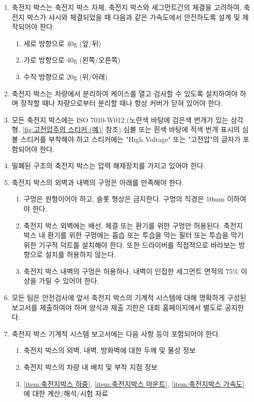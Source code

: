 \documentclass[final,a4paper,10pt]{report}
\begin{document}
\begin{enumerate}
  \item 축전지 박스는 축전지 박스 자체, 축전지 박스와 세그먼트간의 체결을 고려하여, 축전지 박스가 샤시와 체결되었을 때 다음과 같은 가속도에서 안전하도록 설계 및 제작되어야 한다. \label{item:축전지박스 가속도}
    \begin{enumerate}
      \item 세로 방향으로 40g (앞/뒤)
      \item 가로 방향으로 40g (왼쪽/오른쪽)
      \item 수직 방향으로 20g (위/아래)
    \end{enumerate}
    
  \item 축전지 박스는 차량에서 분리하여 케이스를 열고 검사할 수 있도록 설치하여야 하며 장착할 때나 차량으로부터 분리할 때나 항상 커버가 닫혀 있어야 한다.
  \item 모든 축전지 박스에는 ISO 7010-W012 (노란색 바탕에 검은색 번개가 있는 삼각형, \cref{fig:고전압주의 스티커 (예)} 참조) 심볼 또는 흰색 바탕에 적색 번개 표시의 심볼 스티커를 부착해야 하고 스티커에는 "High Voltage" 또는 "고전압"의 글자가 포함되어야 한다.


  \item 밀폐된 구조의 축전지 박스는 압력 해제장치를 가지고 있어야 한다.
  
  \item 축전지 박스의 외벽과 내벽의 구멍은 아래를 만족해야 한다.
    \begin{enumerate}
      \item 구멍은 원형이어야 하고, 슬롯 형상은 금지한다. 구멍의 직경은 10mm 이하여야 한다.
      \item 축전지 박스 외벽에는 배선, 체결 또는 환기를 위한 구멍만 허용된다. 축전지 박스 내 환기를 위한 구멍에는 흡습 또는 투습을 막는 필터 또는 투습을 막기 위한 기구적 덕트를 설치해야 한다. 또한 드라이버를 직접적으로 바라보는 방향으로 설치를 허용하지 않는다.
      \item 축전지 박스 내벽의 구멍은 허용하나, 내벽이 인접한 세그먼트 면적의 75\% 이상을 가릴 수 있어야 한다.
    \end{enumerate}
    
  \item 모든 팀은 안전검사에 앞서 축전지 박스의 기계적 시스템에 대해 명확하게 구성된 보고서를 제출하여야 하며 양식과 제출 기한은 대회 홈페이지에서 별도로 공지한다.
  
  \item 축전지 박스 기계적 시스템 보고서에는 다음 사항 등이 포함되어야 한다.
    \begin{enumerate}
      \item 축전지 박스의 외벽, 내벽, 방화벽에 대한 두께 및 물성 정보
      \item 축전지 박스의 차량 내 배치 및 부착 지점 정보
      \item \cref{item:축전지박스 하중}, \cref{item:축전지박스 마운트}, \cref{item:축전지박스 가속도}에 대한 계산/해석/시험 자료
    \end{enumerate}
    

\end{enumerate}
\end{document}
